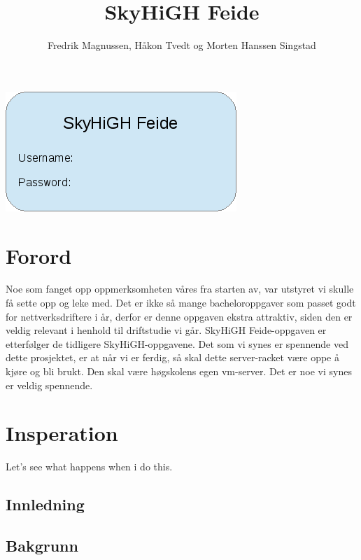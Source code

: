 \documentclass[12pt,a4paper]{article}
\begin{document}
\title{SkyHiGH Feide}
\author{Fredrik Magnussen, Håkon Tvedt og Morten Hanssen Singstad}
\maketitle 
\begin{center}
\includegraphics[scale=1]{frontpageimage.png}
\end{center}

\newpage
\tableofcontents


\newpage
\section{Forord}
Noe som fanget opp oppmerksomheten våres fra starten av, var utstyret vi skulle få sette opp og leke med. Det er ikke så mange bacheloroppgaver som passet godt for nettverksdriftere i år, derfor er denne oppgaven ekstra attraktiv, siden den er veldig relevant i henhold til driftstudie vi går. SkyHiGH Feide-oppgaven er etterfølger de tidligere SkyHiGH-oppgavene. Det som vi synes er spennende ved dette prosjektet, er at når vi er ferdig, så skal dette server-racket være oppe å kjøre og bli brukt. Den skal være høgskolens egen vm-server. Det er noe vi synes er veldig spennende.

\section{Insperation}
Let's see what happens when i do this.

\newpage
\begin{center}
\section{Innledning}
\end{center}
\subsection{Bakgrunn}
\end{document}
